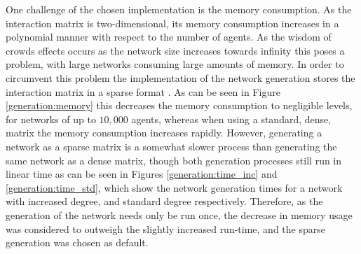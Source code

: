 \documentclass[a4paper, 12pt]{report}
\begin{document}
One challenge of the chosen implementation is the memory consumption. As the interaction matrix is two-dimensional, its memory consumption increases in a polynomial manner with respect to the number of agents. As the wisdom of crowds effects occurs as the network size increases towards infinity this poses a problem, with large networks consuming large amounts of memory. In order to circumvent this problem the implementation of the network generation stores the interaction matrix in a sparse format \parencite{2020SciPy-NMeth}. As can be seen in Figure \ref{generation:memory} this decreases the memory consumption to negligible levels, for networks of up to $10,000$ agents, whereas when using a standard, dense, matrix the memory consumption increases rapidly. \newline
However, generating a network as a sparse matrix is a somewhat slower process than generating the same network as a dense matrix, though both generation processes still run in linear time as can be seen in Figures \ref{generation:time_inc} and \ref{generation:time_std},  which show the network generation times for a network with increased degree, and standard degree respectively. Therefore, as the generation of the network needs only be run once, the decrease in memory usage was considered to outweigh the slightly increased run-time, and the sparse generation was chosen as default.
\end{document}
